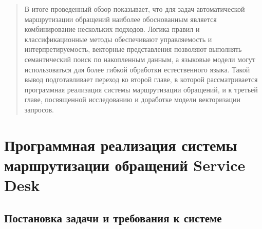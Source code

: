 \documentclass[
]{article}
\begin{document}
\begin{quote}
В итоге проведенный обзор показывает, что для задач автоматической
маршрутизации обращений наиболее обоснованным является комбинирование
нескольких подходов. Логика правил и классификационные методы
обеспечивают управляемость и интерпретируемость, векторные представления
позволяют выполнять семантический поиск по накопленным данным, а
языковые модели могут использоваться для более гибкой обработки
естественного языка. Такой вывод подготавливает переход ко второй главе,
в которой рассматривается программная реализация системы маршрутизации
обращений, и к третьей главе, посвященной исследованию и доработке
модели векторизации запросов.
\end{quote}

\hypertarget{ux43fux440ux43eux433ux440ux430ux43cux43cux43dux430ux44f-ux440ux435ux430ux43bux438ux437ux430ux446ux438ux44f-ux441ux438ux441ux442ux435ux43cux44b-ux43cux430ux440ux448ux440ux443ux442ux438ux437ux430ux446ux438ux438-ux43eux431ux440ux430ux449ux435ux43dux438ux439-service-desk}{%
\section{Программная реализация системы маршрутизации обращений Service
Desk}\label{ux43fux440ux43eux433ux440ux430ux43cux43cux43dux430ux44f-ux440ux435ux430ux43bux438ux437ux430ux446ux438ux44f-ux441ux438ux441ux442ux435ux43cux44b-ux43cux430ux440ux448ux440ux443ux442ux438ux437ux430ux446ux438ux438-ux43eux431ux440ux430ux449ux435ux43dux438ux439-service-desk}}

\hypertarget{ux43fux43eux441ux442ux430ux43dux43eux432ux43aux430-ux437ux430ux434ux430ux447ux438-ux438-ux442ux440ux435ux431ux43eux432ux430ux43dux438ux44f-ux43a-ux441ux438ux441ux442ux435ux43cux435}{%
\subsection{\texorpdfstring{Постановка задачи и требования к системе
}{Постановка задачи и требования к системе }}\label{ux43fux43eux441ux442ux430ux43dux43eux432ux43aux430-ux437ux430ux434ux430ux447ux438-ux438-ux442ux440ux435ux431ux43eux432ux430ux43dux438ux44f-ux43a-ux441ux438ux441ux442ux435ux43cux435}}
\end{document}
